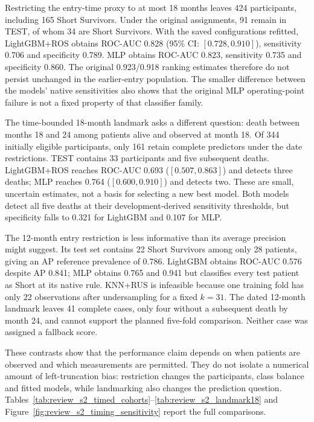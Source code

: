 Restricting the entry-time proxy to at most 18 months leaves 424 participants, including 165 Short Survivors. Under the original assignments, 91 remain in TEST, of whom 34 are Short Survivors. With the saved configurations refitted, LightGBM+ROS obtains ROC-AUC 0.828 (95\% CI: $[0.728,0.910]$), sensitivity 0.706 and specificity 0.789. MLP obtains ROC-AUC 0.823, sensitivity 0.735 and specificity 0.860. The original 0.923/0.918 ranking estimates therefore do not persist unchanged in the earlier-entry population. The smaller difference between the models' native sensitivities also shows that the original MLP operating-point failure is not a fixed property of that classifier family.

The time-bounded 18-month landmark asks a different question: death between months 18 and 24 among patients alive and observed at month 18. Of 344 initially eligible participants, only 161 retain complete predictors under the date restrictions. TEST contains 33 participants and five subsequent deaths. LightGBM+ROS reaches ROC-AUC 0.693 ($[0.507,0.863]$) and detects three deaths; MLP reaches 0.764 ($[0.600,0.910]$) and detects two. These are small, uncertain estimates, not a basis for selecting a new best model. Both models detect all five deaths at their development-derived sensitivity thresholds, but specificity falls to 0.321 for LightGBM and 0.107 for MLP.

The 12-month entry restriction is less informative than its average precision might suggest. Its test set contains 22 Short Survivors among only 28 patients, giving an AP reference prevalence of 0.786. LightGBM obtains ROC-AUC 0.576 despite AP 0.841; MLP obtains 0.765 and 0.941 but classifies every test patient as Short at its native rule. KNN+RUS is infeasible because one training fold has only 22 observations after undersampling for a fixed $k=31$. The dated 12-month landmark leaves 41 complete cases, only four without a subsequent death by month 24, and cannot support the planned five-fold comparison. Neither case was assigned a fallback score.

These contrasts show that the performance claim depends on when patients are observed and which measurements are permitted. They do not isolate a numerical amount of left-truncation bias: restriction changes the participants, class balance and fitted models, while landmarking also changes the prediction question. Tables~\ref{tab:review_s2_timed_cohorts}--\ref{tab:review_s2_landmark18} and Figure~\ref{fig:review_s2_timing_sensitivity} report the full comparisons.

